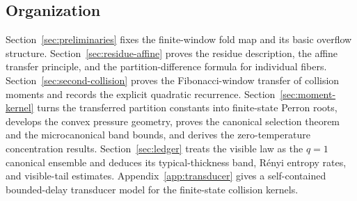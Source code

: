 \subsection{Organization}

Section~\ref{sec:preliminaries} fixes the finite-window fold map and its basic
overflow structure.  Section~\ref{sec:residue-affine} proves the residue
description, the affine transfer principle, and the partition-difference
formula for individual fibers.  Section~\ref{sec:second-collision} proves the
Fibonacci-window transfer of collision moments and records the explicit
quadratic recurrence.  Section~\ref{sec:moment-kernel} turns the transferred
partition constants into finite-state Perron roots, develops the convex
pressure geometry, proves the canonical selection theorem and the
microcanonical band bounds, and derives the zero-temperature concentration
results.  Section~\ref{sec:ledger} treats the visible law as the \(q=1\)
canonical ensemble and deduces its typical-thickness band, R\'enyi entropy
rates, and visible-tail estimates.  Appendix~\ref{app:transducer} gives a
self-contained bounded-delay transducer model for the finite-state collision
kernels.
